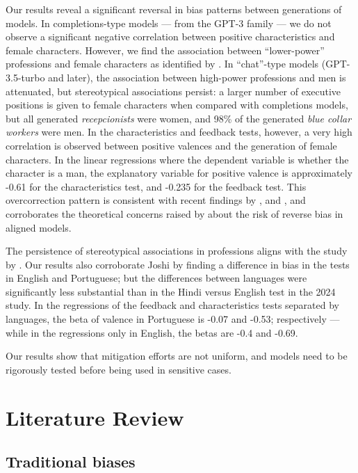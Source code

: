 \documentclass[12pt,a4paper]{article}
\begin{document}
Our results reveal a significant reversal in bias patterns between generations of models. In completions-type models --- from the
GPT-3 family --- we do not observe a significant negative correlation between positive characteristics and female characters. However, we find the association between ``lower-power'' professions and female characters as identified by \citet{lucy2021}. In ``chat''-type models (GPT-3.5-turbo and later), the association between high-power professions and men is attenuated, but stereotypical associations persist: a larger number of executive positions is given to female characters when compared with completions models, but all generated \textit{recepcionists} were women,
and 98\% of the generated \textit{blue collar workers} were men. In the characteristics and feedback tests, however, a very high correlation is observed between positive valences and the generation of female characters. In the linear regressions where the dependent variable is whether the character is a man, the explanatory variable for positive valence is approximately -0.61 for the characteristics test, and -0.235 for the feedback test. This overcorrection pattern is consistent with recent findings by \citet{mirza2024}, \citet{karvonen2025} and \citet{balestri2024,balestri2025}, and corroborates the theoretical concerns raised by \citet{liu2025} about the risk of reverse bias in aligned models.

The persistence of stereotypical associations in professions aligns with the study by \citet{joshi2024}. Our results also corroborate Joshi by finding a difference in bias in the tests in English and Portuguese; but the differences between languages were significantly less substantial than in the Hindi versus English test in the 2024 study. In the regressions of the feedback and characteristics tests separated by languages, the beta of valence in Portuguese is -0.07 and -0.53;
respectively --- while in the regressions only in English, the betas are -0.4 and -0.69.

Our results show that mitigation efforts are not uniform, and models need to be rigorously tested before being
used in sensitive cases.


\section{Literature Review}



\subsection{Traditional biases}
\end{document}
